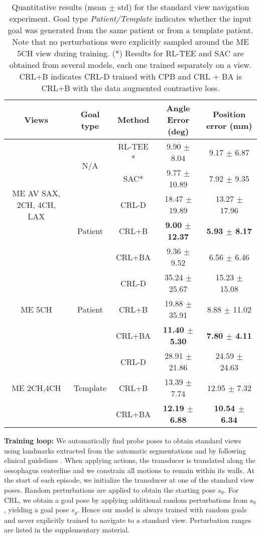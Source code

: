 \begin{table}[t!]
\centering
\caption{Quantitative results (mean $\pm$ std) for the standard view navigation experiment. Goal type \textit{Patient/Template} indicates whether the input goal was generated from the same patient or from a template patient. Note that no perturbations were explicitly sampled around the ME 5CH view during training. (*) Results for RL-TEE and SAC are obtained from several models, each one trained separately on a view. CRL+B indicates CRL-D trained with CPB and CRL + BA is CRL+B with the data augmented contrastive loss.}
\begin{tabular}{|c|c|c|c|c|}  
 \hline
 Views & Goal type & Method & Angle Error (deg) & Position error (mm) \\
\hline
\hline
 \multirow{5}{1.8cm}{ME AV SAX, 2CH, 4CH, LAX} & \multirow{2}{*}{N/A} & RL-TEE \cite{Li2023RLTEEAP}* & 9.90 $\pm$ 8.04 & 9.17 $\pm$ 6.87  \\
 \cline{3-5}
& & SAC* \cite{Haarnoja2018SoftAO} & 9.77 $\pm$ 10.89 & 7.92 $\pm$ 9.35 \\
\cline{2-5}
& \multirow{3}{*}{Patient} & CRL-D \cite{Eysenbach2022ContrastiveLA} & 18.47 $\pm$ 19.89 & 13.27 $\pm$ 17.96 \\
\cline{3-5}
& & CRL+B  & \textbf{9.00 $\pm$ 12.37} & \textbf{5.93 $\pm$ 8.17}\\
\cline{3-5}
& & CRL+BA & 9.36 $\pm$ 9.52 & 6.56 $\pm$ 6.46\\
\hline
\hline
\multirow{3}{*}{ME 5CH} & \multirow{3}{*}{Patient} & CRL-D \cite{Eysenbach2022ContrastiveLA}  & 35.24 $\pm$ 25.67 & 15.23 $\pm$ 15.08 \\
\cline{3-5}
& & CRL+B & 19.88 $\pm$ 35.91 & 8.88 $\pm$ 11.02 \\
\cline{3-5}
& & CRL+BA & \textbf{11.40 $\pm$ 5.30} & \textbf{7.80 $\pm$ 4.11} \\
\hline
\hline
\multirow{3}{1.5cm}{ME 2CH,4CH} & \multirow{3}{*}{Template} & CRL-D \cite{Eysenbach2022ContrastiveLA} & 28.91 $\pm$ 21.86 & 24.59 $\pm$ 24.63\\
\cline{3-5}
& & CRL+B & 13.39 $\pm$ 7.74 & 12.95 $\pm$ 7.32\\
\cline{3-5}
& & CRL+BA & \textbf{12.19 $\pm$ 6.88} & \textbf{10.54 $\pm$ 6.34} \\
\hline
\end{tabular}
\label{table:standard_view_experiment}
\end{table}


\textbf{Training loop:} We automatically find probe poses to obtain standard views using landmarks extracted from the automatic segmentations and by following clinical guidelines \cite{hanh2013}. When applying actions, the transducer is translated along the oesophagus centerline and we constrain all motions to remain within its walls. At the start of each episode, we initialize the transducer at one of the standard view poses. Random perturbations are applied to obtain the starting pose $s_0$. For CRL, we obtain a goal pose by applying additional random perturbations from $s_0$, yielding a goal pose $s_g$. Hence our model is always trained with random goals and never explicitly trained to navigate to a standard view. Perturbation ranges are listed in the supplementary material.

